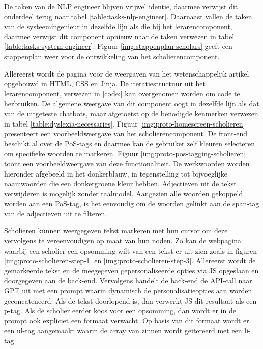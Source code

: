 De taken van de NLP engineer blijven vrijwel identie, daarmee verwijst dit onderdeel terug naar tabel \ref{table:tasks-nlp-engineer}. Daarnaast vallen de taken van de systeemingenieur in dezelfde lijn als die bij het lerarencomponent, daarmee verwijst dit component opnieuw naar de taken verwezen in tabel \ref{table:tasks-system-engineer}. Figuur \ref{img:stappenplan-scholars} geeft een stappenplan weer voor de ontwikkeling van het scholierencomponent.

\medspace

Allereerst wordt de pagina voor de weergaven van het wetenschappelijk artikel opgebouwd in HTML, CSS en Jinja. De iteratiestructuur uit het lerarencomponent, verwezen in \ref{code:} kan overgenomen worden om code te herbruiken. De algemene weergave van dit component oogt in dezelfde lijn als dat van de uitgeteste chatbots, maar afgetoetst op de benodigde kenmerken verwezen in tabel \ref{table:dyslexia-necessaries}. Figuur \ref{img:proto-homescreen-scholieren} presenteert een voorbeeldweergave van het scholierencomponent. De front-end beschikt al over de PoS-tags en daarmee kan de gebruiker zelf kleuren selecteren om specifieke woorden te markeren. Figuur \ref{img:proto-pos-tagging-scholieren} toont een voorbeeldweergave van deze functionaliteit. De werkwoorden worden hieronder afgebeeld in het donkerblauw, in tegenstelling tot bijvoeglijke naamwoorden die een donkergroene kleur hebben. Adjectieven uit de tekst verwijderen is mogelijk zonder taalmodel. Aangezien alle woorden gekoppeld worden aan een PoS-tag, is het eenvoudig om de woorden gelinkt aan de span-tag van de adjectieven uit te filteren.

\medspace

Scholieren kunnen weergegeven tekst markeren met hun cursor om deze vervolgens te vereenvoudigen op maat van hun noden. Zo kan de webpagina waarbij een scholier een opsomming wilt van een tekst er uit zien zoals in figuren \ref{img:proto-scholieren-step-1} en \ref{img:proto-scholieren-step-3}. Allereerst wordt de gemarkeerde tekst en de meegegeven gepersonaliseerde opties via JS opgeslaan en doorgegeven aan de back-end. Vervolgens handelt de back-end de API-call naar GPT uit met een prompt waarin dynamisch de personalisatieopties aan worden geconcateneerd. Als de tekst doorlopend is, dan verwerkt JS dit resultaat als een p-tag. Als de scholier eerder koos voor een opsomming, dan wordt er in de prompt ook expliciet een formaat verwacht. Op basis van dit formaat wordt er een ul-tag aangemaakt waarin de array van zinnen wordt geitereerd met een li-tag. 

